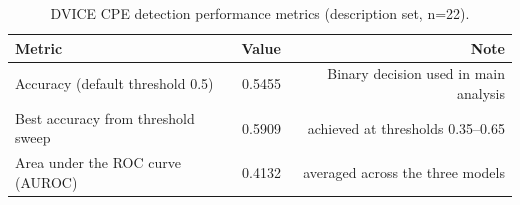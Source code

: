 \begin{table}[htbp]
\centering
\small
\caption{DVICE CPE detection performance metrics (description set, n=22).}
\label{tab:dvice-performance}

\begin{tabular}{lrr}
\toprule
\textbf{Metric} & \textbf{Value} & \textbf{Note} \\
\midrule
Accuracy (default threshold 0.5)     & 0.5455 & Binary decision used in main analysis \\
Best accuracy from threshold sweep   & 0.5909 & achieved at thresholds 0.35--0.65 \\
Area under the ROC curve (AUROC)     & 0.4132 & averaged across the three models \\
\bottomrule
\end{tabular}

\end{table}